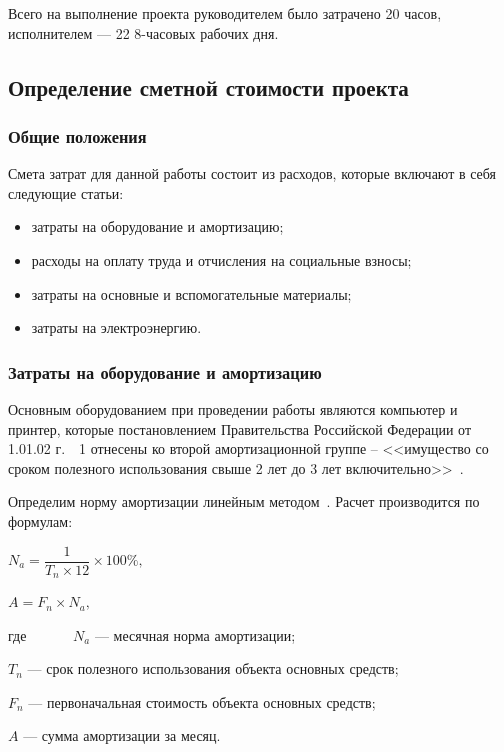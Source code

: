Всего на выполнение проекта руководителем было затрачено 20 часов, исполнителем --- 22 8-часовых
рабочих дня.


\subsection{Определение сметной стоимости проекта}
\subsubsection{Общие положения}

Смета затрат для данной работы состоит из расходов, которые включают в себя следующие статьи:

\begin{itemize}
\item затраты на оборудование и амортизацию;
\item расходы на оплату труда и отчисления на социальные взносы;
\item затраты на основные и вспомогательные материалы;
\item затраты на электроэнергию.
\end{itemize}
\subsubsection{Затраты на оборудование и амортизацию}

Основным оборудованием при проведении работы являются компьютер и принтер, которые 
постановлением Правительства Российской Федерации от 1.01.02 г.~\textnumero~1 отнесены ко второй амортизационной группе – 
<<имущество со сроком полезного использования свыше 2 лет до 3 лет включительно>>~\cite{amort}. 

Определим норму амортизации линейным методом~\cite{frolova}. Расчет производится по формулам:

\begin{center}
 $ N_{a} = \dfrac{1}{T_{n}\times12}\times 100\%,$
 \end{center}
 \begin{center}
 $ A = F_{n}\times N_{a}, $
\end{center}
где~~~~~ \ $N_{a}$ --- месячная норма амортизации;

$T_{n}$ --- срок полезного использования объекта основных средств;

$F_{n}$ --- первоначальная стоимость объекта основных средств;

$A$ --- сумма амортизации за месяц.

